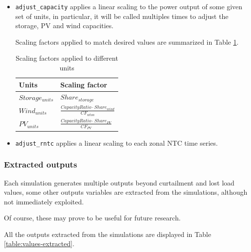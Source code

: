 \begin{itemize}
    \item \texttt{adjust\_capacity} applies a linear scaling to the power output of some given set of units, in particular, it will be called multiples times to adjust the storage, PV and wind capacities.
    
    Scaling factors applied to match desired values are summarized in Table \ref{table:scaling-factors}.

    \begin{table}[h]
        \centering
        \begin{tabular}{|l l|}
            \hline  
            Units              & Scaling factor    \\ \hline
            $Storage_{units}$  & $Share_{storage}$ \\ 
            $Wind_{units}$     & $\frac{CapacityRatio \cdot Share_{wind}}{CF_{wton}}$ \\
            $PV_{units}$       & $\frac{CapacityRatio \cdot Share_{PV}}{CF_{PV}}$ \\ \hline
        \end{tabular}
        \caption{Scaling factors applied to different units}
        \label{table:scaling-factors}
    \end{table}

    \item \texttt{adjust\_rntc} applies a linear scaling to each zonal NTC time series.
\end{itemize}

\subsubsection{Extracted outputs}

Each simulation generates multiple outputs beyond curtailment and lost load values, some other outputs variables are extracted from the simulations, although not immediately exploited.

Of course, these may prove to be useful for future research.

All the outputs extracted from the simulations are displayed in Table \ref{table:values-extracted}.

